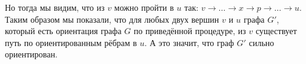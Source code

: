 \begin{figure}[ht!]
\centering
{}
\end{figure}
Но тогда мы видим, что из $v$ можно пройти в $u$ так: $v \rightarrow \ldots \rightarrow x \rightarrow p \rightarrow \ldots \rightarrow u$. Таким образом мы показали, что для любых двух вершин $v$ и $u$ графа $G'$, который есть ориентация графа $G$ по приведённой процедуре, из $v$ существует путь по ориентированным рёбрам в $u$. А это значит, 
что граф $G'$ сильно ориентирован. \xqed

